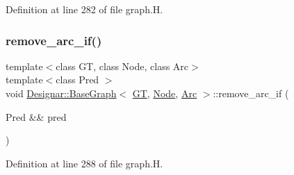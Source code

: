 Definition at line 282 of file graph.\+H.

\mbox{\label{class_designar_1_1_base_graph_a0e516bee6e0247de6bdd207de57caad6}} 
\subsubsection{\texorpdfstring{remove\+\_\+arc\+\_\+if()}{remove\_arc\_if()}\hspace{0.1cm}{\footnotesize\ttfamily [2/2]}}
{\footnotesize\ttfamily template$<$class GT, class Node, class Arc$>$ \\
template$<$class Pred $>$ \\
void \hyperlink{class_designar_1_1_base_graph}{Designar\+::\+Base\+Graph}$<$ \hyperlink{demo-buildgraph_8_c_a3001c40d2c31ca87ed96cd7d1334a55e}{GT}, \hyperlink{namespace_designar_a5af326c65aa2bd26b26c410f2030d09e}{Node}, \hyperlink{namespace_designar_a3f55fb5513d62ff47cbc8f72b8e95d6f}{Arc} $>$\+::remove\+\_\+arc\+\_\+if (\begin{DoxyParamCaption}\item[{Pred \&\&}]{pred }\end{DoxyParamCaption})\hspace{0.3cm}{\ttfamily [inline]}}



Definition at line 288 of file graph.\+H.

\mbox{\label{class_designar_1_1_base_graph_ab7c2c2129abb3200b854e23f34e513e8}} 
